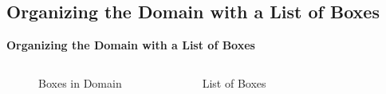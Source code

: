 \subsection{Organizing the Domain with a List of Boxes}
\begin{frame}
    \textbf{Organizing the Domain with a List of Boxes}
    \medskip

    \begin{columns}[c]
    \begin{figure}[h]
        \centering
        \resizebox{.9\textwidth}{!}{%
            
        }
        \caption{Boxes in Domain}
    \end{figure}

    \begin{figure}[h]
        \centering
        \resizebox{.9\textwidth}{!}{%
            
        }
        \caption{List of Boxes}
    \end{figure}
    \end{columns}

\end{frame}


